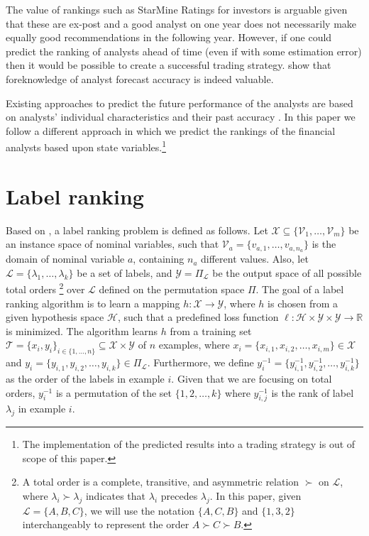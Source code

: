 The value of rankings such as StarMine Ratings for investors is arguable given that these are ex-post and a good analyst on one year does not necessarily make equally good recommendations in the following year. However, if one could predict the ranking of analysts ahead of time (even if with some estimation error) then it would be possible to create a successful trading strategy. \cite{brown2003} show that foreknowledge of analyst forecast accuracy is indeed valuable.

Existing approaches to predict the future performance of the analysts are based on analysts' individual characteristics \citep{clement1999} and their past accuracy \citep{brown2001}. In this paper we follow a different approach in which we predict the rankings of the financial analysts based upon state variables.\footnote{The implementation of the predicted results into a trading strategy is out of scope of this paper.}


\section{Label ranking}
\label{sec:labelranking}

Based on \cite{vembu2009}, a label ranking problem is defined as follows. Let $\mathcal{X} \subseteq \{\mathcal{V}_1,\ldots,\mathcal{V}_m\}$ be an instance space of nominal variables, such that $\mathcal{V}_a=\{v_{a,1}, \ldots, v_{a,n_a}\}$ is the domain of nominal variable $a$, containing $n_a$ different values.  Also, let $\mathcal{L} = \{\lambda_1,\ldots,\lambda_k\}$ be a set of labels, and $\mathcal{Y} = \Pi_{\mathcal{L}}$ be the output space of all possible total orders \footnote{A total order is a complete, transitive, and asymmetric relation $\succ$ on $\mathcal{L}$, where $\lambda_i \succ \lambda_j$ indicates that $\lambda_i$ precedes $\lambda_j$. In this paper, given $\mathcal{L}=\{A,B,C\}$, we will use the notation $\{A,C,B\}$ and $\{1,3,2\}$ interchangeably to represent the order $A \succ C \succ B$.}  over $\mathcal{L}$ defined on the permutation space $\Pi$. The goal of a label ranking algorithm is to learn a mapping $h: \mathcal{X} \rightarrow \mathcal{Y}$, where $h$ is chosen from a given hypothesis space $\mathcal{H}$, such that a predefined loss function $\ell: \mathcal{H} \times \mathcal{Y} \times \mathcal{Y} \rightarrow \mathbb{R}$ is minimized. The algorithm learns $h$ from a training set $\mathcal{T}=\{x_i,y_i\}_{i \in \{1, \ldots, n\}} \subseteq \mathcal{X} \times \mathcal{Y}$ of $n$ examples, where $x_i = \{x_{i,1}, x_{i,2}, \ldots, x_{i,m} \} \in \mathcal{X}$ and $ y_i = \{y_{i,1}, y_{i,2}, \dots, y_{i,k}\} \in \Pi_{\mathcal{L}}$. Furthermore, we define $y_i^{-1} = \{y_{i,1}^{-1}, y_{i,2}^{-1}, \ldots, y_{i,k}^{-1}\}$ as the order of the labels in example $i$. Given that we are focusing on total orders, $y_i^{-1}$ is a permutation of the set $\{1, 2, \ldots, k\}$ where $y_{i,j}^{-1}$ is the rank of label $\lambda_j$ in example $i$.


